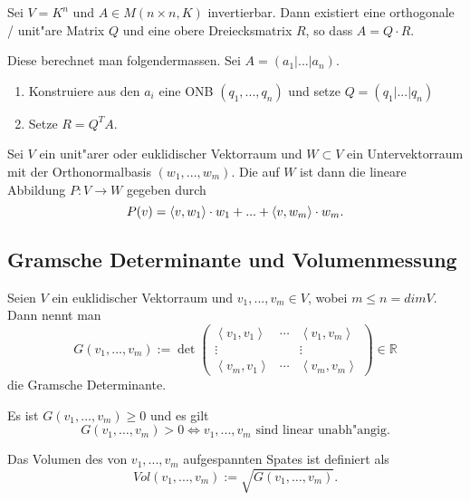\documentclass[8pt, a4paper, twocolumn, landscape]{article}
\begin{document}
\begin{remark} 
Sei $V = K^n$ und $A \in M(n \times n, K)$ invertierbar. Dann existiert eine orthogonale / unit"are Matrix  $Q$ und eine obere Dreiecksmatrix $R$, so dass $
A = Q \cdot R.$

Diese berechnet man folgendermassen. Sei $A = (a_1 | ... |a_n)$.
\begin{enumerate}
\item Konstruiere aus den $a_i$ eine ONB $(q_1, ..., q_n)$ und setze $Q = (q_1| ...|q_n)$
\item Setze $R = Q^T A$.
\end{enumerate}
\end{remark}


\begin{definition}
Sei $V$ ein unit"arer oder euklidischer Vektorraum und $W \subset V$ ein Untervektorraum mit der Orthonormalbasis $(w_1, ..., w_m)$.
Die  auf $W$ ist dann die lineare Abbildung $P : V \rightarrow W$ gegeben durch 
$$P(v) = \left\langle {v} , {w_1} \right\rangle \cdot w_1 + ... + \left\langle {v} , {w_m} \right\rangle\cdot w_m.$$
\end{definition}
\subsection{Gramsche Determinante und Volumenmessung}

\begin{definition}
Seien $V$ ein euklidischer Vektorraum und $v_1, ..., v_m \in V$, wobei $m \leq n = dim V$.
Dann nennt man 
$$
G\left(v_{1}, \ldots, v_{m}\right):=\operatorname{det}\left(\begin{array}{ccc}\left\langle v_{1}, v_{1}\right\rangle & \cdots & \left\langle v_{1}, v_{m}\right\rangle \\ \vdots & & \vdots \\ \left\langle v_{m}, v_{1}\right\rangle & \cdots & \left\langle v_{m}, v_{m}\right\rangle\end{array}\right) \in \mathbb{R}
$$
die Gramsche Determinante.
\end{definition}

\begin{remark}
Es ist $G\left(v_{1}, \ldots, v_{m}\right) \geq 0$ und es gilt
$$
G\left(v_{1}, \ldots, v_{m}\right) > 0 \Leftrightarrow v_1, ..., v_m \text{ sind linear unabh"angig.}
$$
\end{remark}

\begin{definition}
Das Volumen des von  $v_1, ..., v_m$ aufgespannten Spates ist definiert als 
$$
Vol(v_1, ..., v_m) := \sqrt{G\left(v_{1}, \ldots, v_{m}\right)}.
$$
\end{definition}
\end{document}
